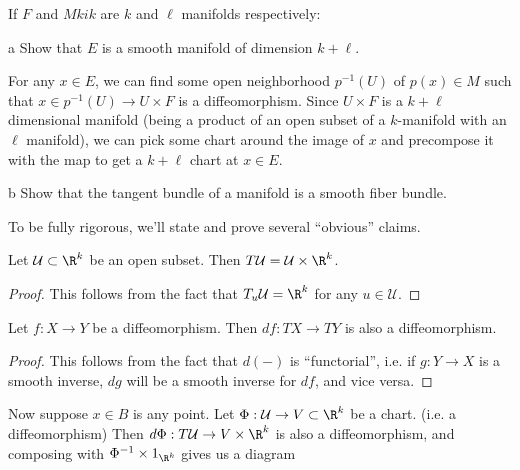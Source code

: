 \documentclass[11pt,letterpaper]{article}
\begin{document}
\begin{solution}
    If $F$ and $Mkik$ are $k$ and $\ell$ manifolds respectively:
    \begin{partproblem}{a}
        Show that $E$ is a smooth manifold of dimension $k+\ell$.
    \end{partproblem}

    \quad For any $x\in E$, we can find some open neighborhood $p^{-1}(U)$ of $p(x)\in M$ such that $x\in p^{-1}(U) \to U\times F$ is a diffeomorphism. Since $U\times F$ is a $k+\ell$ dimensional manifold (being a product of an open subset of a $k$-manifold with an $\ell$ manifold), we can pick some chart around the image of $x$ and precompose it with the map to get a $k+\ell$ chart at $x\in E$.  

    \begin{partproblem}{b}
        Show that the tangent bundle of a manifold is a smooth fiber bundle.
    \end{partproblem}
    \quad To be fully rigorous, we'll state and prove several ``obvious'' claims.
    \begin{claim}
        Let $\mathcal{U}\subset \R^k$ be an open subset. Then $T\mathcal{U} = \mathcal{U} \times \R^k$. 
    \end{claim}
    \begin{proof}
        This follows from the fact that $T_u\mathcal{U} =\R^k$ for any $u\in \mathcal{U}$.
    \end{proof}
    \begin{claim}
        Let $f : X \to Y$ be a diffeomorphism. Then $df : TX \to TY$ is also a diffeomorphism.
    \end{claim}
    \begin{proof}
        This follows from the fact that $d(-)$ is ``functorial'', i.e. if $g : Y \to X$ is a smooth inverse, $dg$ will be a smooth inverse for $df$, and vice versa.
    \end{proof}
    Now suppose $x\in B$ is any point. Let $\Phi :\mathcal{U} \to V\subset \R^k$ be a chart. (i.e. a diffeomorphism) Then $d\Phi : T\mathcal{U} \to V\times \R^k$ is also a diffeomorphism, and composing with $\Phi^{-1}\times 1_{\R^k}$ gives us a diagram

\end{solution}
\end{document}
